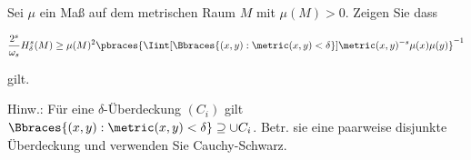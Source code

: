 
\begin{exercise}

Sei $\mu$ ein Maß auf dem metrischen Raum $M$ mit $\mu(M) > 0$.
Zeigen Sie dass

\begin{align*}
    \frac{2^s}{\omega_s} H_\delta^s(M)
    \geq
    \mu(M)^2
    \pbraces
    {
        \Iint[\Bbraces{(x, y): \metric(x, y) < \delta}]
        {
            \metric(x, y)^{-s}
        }{\mu(x)}{\mu(y)}
    }^{-1}
\end{align*}

gilt.

Hinw.:
Für eine $\delta$-Überdeckung $(C_i)$ gilt $\Bbraces{(x, y) : \metric(x, y) < \delta} \supseteq \cup C_i$.
Betr. sie eine paarweise disjunkte Überdeckung und verwenden Sie Cauchy-Schwarz.

\end{exercise}


